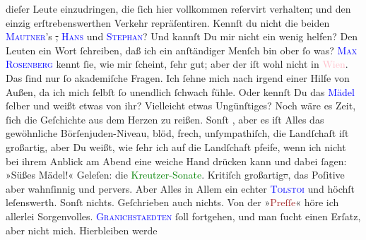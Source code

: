\documentclass[twoside=false,titlepage=false,open=any, parskip=never, fontsize=12pt, headings=small, chapterprefix=false, appendixprefix=false]{scrbook}
\newcommand{\strikeout}[1]{\sout{#1}}
\newcommand{\pbposition}{\depth}
\newcommand{\pb}{\nobreak\hspace{0pt}\raisebox{-0.1em}{\raisebox{\pbposition}{\textnormal{|}}}\nobreak\hspace{0pt}}
\begin{document}
               dieſer Leute einzudringen, die ſich hier vollkommen reſervirt verhalten\strikeout{,} und den einzig erſtrebenswerthen Verkehr
               repräſentiren. Kennſt du nicht die beiden \textsc{\textcolor{blue}{Mautner}{}}’s \strikeout{,}{ }\textsc{\textcolor{blue}{Hans}{}\ledrightnote{\textcolor{blue}{Hans Johann von Mauthner}}} und \textsc{\textcolor{blue}{Stephan}{}\ledrightnote{\textcolor{blue}{Stephan von Mauthner}}}? Und kannſt Du mir nicht ein wenig helfen? Den Leuten ein Wort ſchreiben, daß
               ich ein anſtändiger Menſch bin ober ſo was? \textsc{\textcolor{blue}{Max Rosenberg}{}\ledrightnote{\textcolor{blue}{Max von Rosenberg}}} kennt ſie, wie mir ſcheint, ſehr gut; aber der iſt wohl nicht in \textcolor{pink}{Wien}{}\ledrightnote{\textcolor{pink}{Wien}}. Das ſind nur ſo akademiſche Fragen. Ich ſehne
               mich nach irgend einer Hilfe von Außen, da ich mich ſelbſt ſo unendlich ſchwach
               fühle. Oder kennſt Du das {\pb}\textcolor{blue}{Mädel}{} ſelber und weißt etwas
               von ihr? Vielleicht etwas Ungünſtiges? Noch wäre es Zeit, ſich die Geſchichte aus dem
               Herzen zu reißen.\pend
           \pstart
           Sonſt \label{K_L02649-4v}\label{K_L02649-4h}, aber es iſt Alles das gewöhnliche Börſenjuden-Niveau, blöd, frech,
               unſympathiſch, die Landſchaſt iſt großartig, aber Du weißt, wie ſehr ich auf die
               Landſchaft pfeife, wenn ich nicht bei ihrem Anblick am Abend eine weiche Hand drücken
               kann und dabei ſagen: »Süßes Mädel!«\pend
           \pstart
           Geleſen: die 
                  \textcolor{green}{Kreutzer-Sonate}{}\ledrightnote{\textcolor{green}{Die Kreutzersonate}}. Kritiſch großartig\strikeout{\textcolor{gray}{e}}, das Poſitive aber wahnſinnig und pervers. Aber Alles in Allem ein echter \textsc{\textcolor{blue}{Tolstoi}{}\ledrightnote{\textcolor{blue}{Leo N. von Tolstoi}}} und höchſt leſenswerth. Sonſt nichts. Geſchrieben auch nichts. Von der »\textcolor{brown}{Preſſe}{}\ledrightnote{\textcolor{brown}{Die Presse}}« höre ich allerlei Sorgenvolles. \textsc{\textcolor{blue}{Granichstaedten}{}\ledrightnote{\textcolor{blue}{Emil Granichstaedten}}} ſoll fortgehen, und man ſucht einen Erſatz, aber nicht mich. Hierbleiben werde
\end{document}
